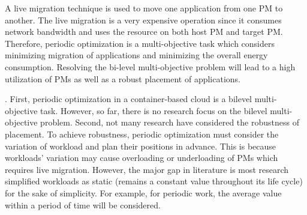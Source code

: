 


\vspace{5mm}


 A live migration technique is used to move one application from one PM to another. The live migration is a very expensive operation since it consumes network bandwidth and uses the resource on both host PM and target PM. Therefore, periodic optimization is a multi-objective task which considers minimizing migration of applications and minimizing the overall energy consumption. Resolving the bi-level multi-objective problem will lead to a high utilization of PMs as well as a robust placement of applications.

. 
First, periodic optimization in a container-based cloud is a bilevel multi-objective task.
However, so far, there is no research focus on the bilevel multi-objective problem. 
Second, not many research have considered the robustness of placement. To achieve robustness, periodic optimization must consider the variation of workload and plan their positions in advance. This is because workloads' variation may cause overloading or underloading of PMs which requires live migration. However, the major gap in literature is most research simplified workloads as static (remains a constant value throughout its life cycle) \cite{Viswanathan:2012ej, Chen:2011fl,Feller:2011vs} for the sake of simplicity. For example, for periodic work, the average value within a period of time will be considered. 

